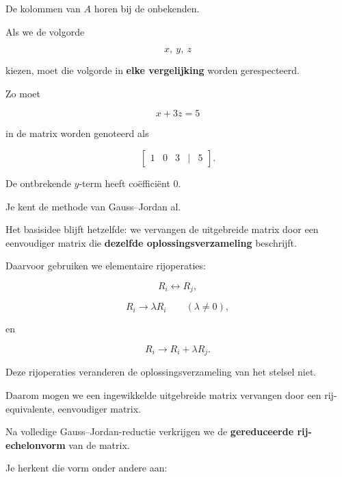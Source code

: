 \documentclass{ximera}
\begin{document}
\begin{opmerking}

De kolommen van \(A\) horen bij de onbekenden.

Als we de volgorde

\[
x,\ y,\ z
\]

kiezen, moet die volgorde in \textbf{elke vergelijking} worden gerespecteerd.

Zo moet

\[
x+3z=5
\]

in de matrix worden genoteerd als

\[
\begin{bmatrix}
1&0&3&|&5
\end{bmatrix}.
\]

De ontbrekende \(y\)-term heeft coëfficiënt \(0\).
\end{opmerking}





Je kent de methode van Gauss--Jordan al.

Het basisidee blijft hetzelfde: we vervangen de uitgebreide matrix door
een eenvoudiger matrix die \textbf{dezelfde oplossingsverzameling}
beschrijft.

Daarvoor gebruiken we elementaire rijoperaties:

\[
R_i\leftrightarrow R_j,
\]

\[
R_i\longrightarrow \lambda R_i
\qquad (\lambda\neq 0),
\]

en

\[
R_i\longrightarrow R_i+\lambda R_j.
\]


\begin{opmerking}
Deze rijoperaties veranderen de oplossingsverzameling van het stelsel niet.

Daarom mogen we een ingewikkelde uitgebreide matrix vervangen door een
rij-equivalente, eenvoudiger matrix.
\end{opmerking}



Na volledige Gauss--Jordan-reductie verkrijgen we de
\textbf{gereduceerde rij-echelonvorm} van de matrix.

Je herkent die vorm onder andere aan:
\end{document}
